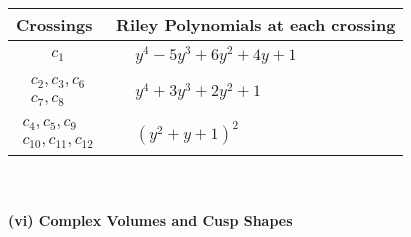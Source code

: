 \documentclass[1p]{elsarticle_modified}
\theoremstyle{definition}
\begin{document}
\begin{tabular}{m{50pt}|m{274pt}}
Crossings & \hspace{64pt}Riley Polynomials at each crossing \\
\hline $$\begin{aligned}c_{1}\end{aligned}$$&$\begin{aligned}
&y^4-5 y^3+6 y^2+4 y+1
\end{aligned}$\\
\hline $$\begin{aligned}c_{2},c_{3},c_{6}\\c_{7},c_{8}\end{aligned}$$&$\begin{aligned}
&y^4+3 y^3+2 y^2+1
\end{aligned}$\\
\hline $$\begin{aligned}c_{4},c_{5},c_{9}\\c_{10},c_{11},c_{12}\end{aligned}$$&$\begin{aligned}
&(y^2+y+1)^2
\end{aligned}$\\
\hline
\end{tabular}\\~\\
\newpage\flushleft \textbf{(vi) Complex Volumes and Cusp Shapes}
\end{document}
